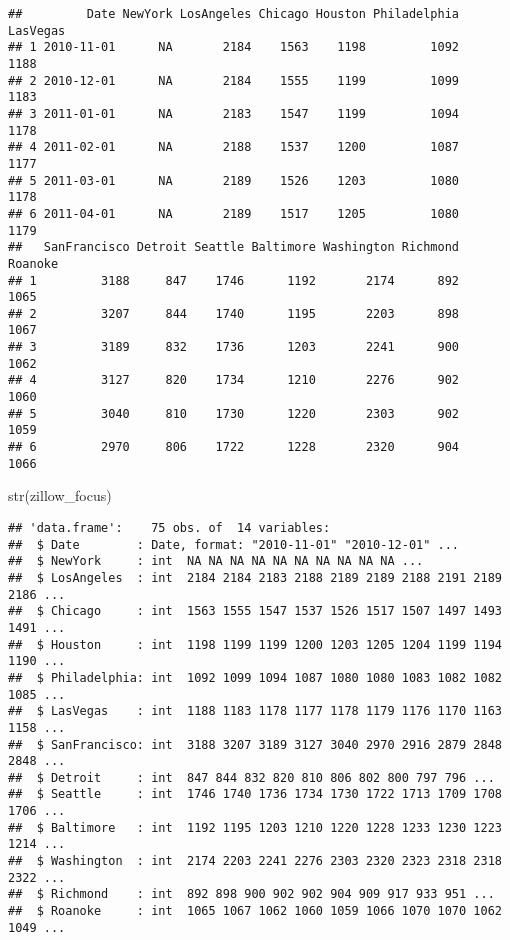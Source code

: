 \documentclass[
]{article}
\newenvironment{Shaded}{\begin{snugshade}}{\end{snugshade}}
\newcommand{\FunctionTok}[1]{\textcolor[rgb]{0.00,0.00,0.00}{#1}}
\newcommand{\NormalTok}[1]{#1}
\begin{document}
\begin{verbatim}
##         Date NewYork LosAngeles Chicago Houston Philadelphia LasVegas
## 1 2010-11-01      NA       2184    1563    1198         1092     1188
## 2 2010-12-01      NA       2184    1555    1199         1099     1183
## 3 2011-01-01      NA       2183    1547    1199         1094     1178
## 4 2011-02-01      NA       2188    1537    1200         1087     1177
## 5 2011-03-01      NA       2189    1526    1203         1080     1178
## 6 2011-04-01      NA       2189    1517    1205         1080     1179
##   SanFrancisco Detroit Seattle Baltimore Washington Richmond Roanoke
## 1         3188     847    1746      1192       2174      892    1065
## 2         3207     844    1740      1195       2203      898    1067
## 3         3189     832    1736      1203       2241      900    1062
## 4         3127     820    1734      1210       2276      902    1060
## 5         3040     810    1730      1220       2303      902    1059
## 6         2970     806    1722      1228       2320      904    1066
\end{verbatim}

\begin{Shaded}
\begin{Highlighting}[]
\FunctionTok{str}\NormalTok{(zillow\_focus)}
\end{Highlighting}
\end{Shaded}

\begin{verbatim}
## 'data.frame':    75 obs. of  14 variables:
##  $ Date        : Date, format: "2010-11-01" "2010-12-01" ...
##  $ NewYork     : int  NA NA NA NA NA NA NA NA NA NA ...
##  $ LosAngeles  : int  2184 2184 2183 2188 2189 2189 2188 2191 2189 2186 ...
##  $ Chicago     : int  1563 1555 1547 1537 1526 1517 1507 1497 1493 1491 ...
##  $ Houston     : int  1198 1199 1199 1200 1203 1205 1204 1199 1194 1190 ...
##  $ Philadelphia: int  1092 1099 1094 1087 1080 1080 1083 1082 1082 1085 ...
##  $ LasVegas    : int  1188 1183 1178 1177 1178 1179 1176 1170 1163 1158 ...
##  $ SanFrancisco: int  3188 3207 3189 3127 3040 2970 2916 2879 2848 2848 ...
##  $ Detroit     : int  847 844 832 820 810 806 802 800 797 796 ...
##  $ Seattle     : int  1746 1740 1736 1734 1730 1722 1713 1709 1708 1706 ...
##  $ Baltimore   : int  1192 1195 1203 1210 1220 1228 1233 1230 1223 1214 ...
##  $ Washington  : int  2174 2203 2241 2276 2303 2320 2323 2318 2318 2322 ...
##  $ Richmond    : int  892 898 900 902 902 904 909 917 933 951 ...
##  $ Roanoke     : int  1065 1067 1062 1060 1059 1066 1070 1070 1062 1049 ...
\end{verbatim}
\end{document}
